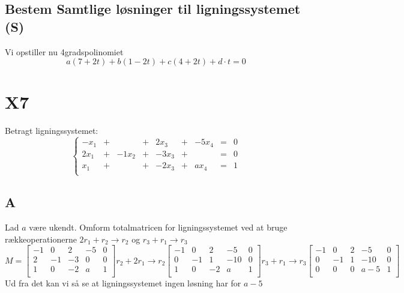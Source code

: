 \documentclass[a4paper,fleqn]{report}
\begin{document}
	\subsection{Bestem Samtlige løsninger til ligningssystemet (S)}
	Vi opstiller nu 4gradspolinomiet
	\[a(7+2t) + b(1-2t) + c(4+2t) + d\cdot t = 0 \]

	\section{X7}
	Betragt ligningssystemet:
	\[ \left\{ 
	\begin{matrix}
		-x_1 &+&&+& 2x_3 &+& -5x_4 &=&0\\
		2x_1 &+& -1x_2 &+&-3x_3 &+&&=&0\\
		x_1  &+& &+& -2x_3 &+& ax_4 &=& 1\\
	\end{matrix}
	\right.\]
	\subsection{A}
	Lad $a$ være ukendt. Omform totalmatricen for ligningssystemet ved at bruge 
	rækkeoperationerne $2r_1 + r_2 \rightarrow r_2$ og $r_3 + r_1 \rightarrow r_3$
	\[
		M = \begin{bmatrix}
			-1 & 0 & 2 & -5 & 0\\
			2 &-1 &-3 & 0 & 0\\
			1 & 0 & -2& a & 1\\
		\end{bmatrix} r_2 + 2r_1 \rightarrow r_2 
		\begin{bmatrix}
			-1 & 0 & 2 & -5 & 0\\
			0 &-1 & 1 & -10 & 0\\
			1 & 0 & -2& a & 1\\
		\end{bmatrix}r_3 + r_1 \rightarrow r_3
		\begin{bmatrix}
			-1 & 0 & 2 & -5 & 0\\
			0 &-1 & 1  & -10 & 0\\
			0 & 0 & 0  & a-5 & 1\\
		\end{bmatrix}
	\]
	Ud fra det kan vi så se at ligningssystemet ingen løsning har for $a-5$
\end{document}
